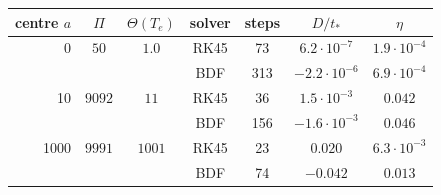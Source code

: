 \begin{tabular}{rcccccc}
\toprule
centre $a$ & $\Pi$ & $\Theta(T_e)$ & solver & steps & $D/t_*$ & $\eta$\\
\midrule
0 & $50$ & $1.0$ & RK45 & 73 & $6.2\cdot10^{-7}$ & $1.9\cdot10^{-4}$\\
 &  &  & BDF & 313 & $-2.2\cdot10^{-6}$ & $6.9\cdot10^{-4}$\\
10 & $9092$ & $11$ & RK45 & 36 & $1.5\cdot10^{-3}$ & $0.042$\\
 &  &  & BDF & 156 & $-1.6\cdot10^{-3}$ & $0.046$\\
1000 & $9991$ & $1001$ & RK45 & 23 & $0.020$ & $6.3\cdot10^{-3}$\\
 &  &  & BDF & 74 & $-0.042$ & $0.013$\\
\bottomrule
\end{tabular}
